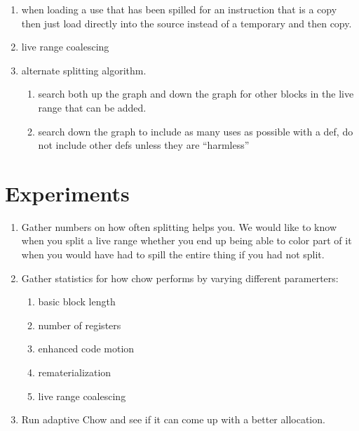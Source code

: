 \documentclass[11pt]{article}
\begin{document}
\begin{enumerate}
\item when loading a use that has been spilled for an instruction
that is a copy then just load directly into the source instead of a
temporary and then copy.

\item live range coalescing

\item alternate splitting algorithm. 
  \begin{enumerate}
  \item search both up the graph and down the graph for other blocks
  in the live range that can be added.
  \item search down the graph to include as many uses as possible with
  a def, do not include other defs unless they are ``harmless''
  \end{enumerate}

\end{enumerate}

\section{Experiments}
\begin{enumerate}
\item Gather numbers on how often splitting helps you. We would like to
know when you split a live range whether you end up being able to
color part of it when you would have had to spill the entire thing if
you had not split.

\item Gather statistics for how chow performs by varying different
paramerters:
\begin{enumerate}
\item basic block length
\item number of registers
\item enhanced code motion
\item rematerialization
\item live range coalescing
\end{enumerate}

\item Run adaptive Chow and see if it can come up with a better
allocation.

\end{enumerate}
\end{document}
